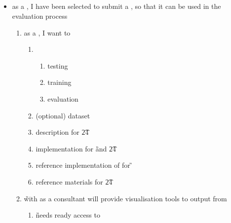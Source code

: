 \documentclass[8pt,letterpaper]{article} %
\newenvironment{slimlist}{
  \begin{itemize}
    \setlength{\topsep}{0pt}
    \setlength{\itemsep}{1pt}
    \setlength{\parsep}{0pt}
    \setlength{\parskip}{0pt}
}{\end{itemize}}
\newenvironment{mitemize}[1]{
  \begin{minipage}{\linewidth}
  \subsection*{#1}
  \begin{slimlist}
}{
\end{slimlist}
\end{minipage}
\vspace{1em}
}
\begin{document}
\begin{mitemize}{\de}
\item as a \de, I have been selected to submit a \cp, so that it can be used in the evaluation process
  \begin{enumerate}
    
  \item as a \de, I want to 
    \begin{enumerate}
    \item \ds
      \begin{enumerate}
      \item testing
      \item training
      \item evaluation
      \end{enumerate}
    \item (optional) dataset  \gen
    \item \tev description for \t24
    \item \tev implementation for \G and \t24
    \item reference implementation of \sol for \G 
    \item reference materials for \t24 
    \end{enumerate}
  \item \G with \de as a consultant will provide visualisation tools to \rep output from 
    \begin{enumerate}
    \item \G needs ready access to \de
    \end{enumerate}
  \end{enumerate}
\end{mitemize}
\end{document}
